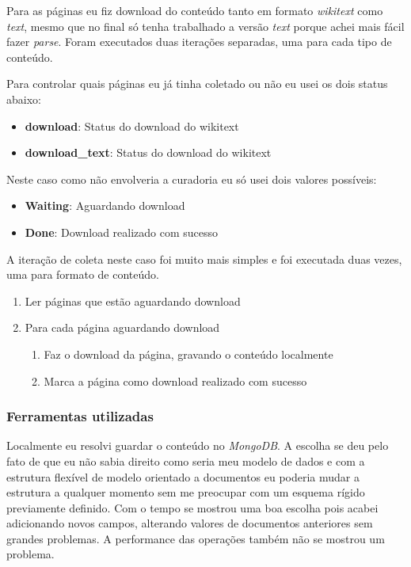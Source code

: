 Para as páginas eu fiz download do conteúdo tanto em formato \textit{wikitext} como \textit{text}, mesmo que no final só tenha trabalhado a 
versão \textit{text} porque achei mais fácil fazer \textit{parse}. Foram executados duas iterações separadas, uma para cada tipo de conteúdo.

Para controlar quais páginas eu já tinha coletado ou não eu usei os dois status abaixo:

\begin{itemize}
    \item \textbf{download}: Status do download do wikitext
    \item \textbf{download\_text}: Status do download do wikitext
\end{itemize}

Neste caso como não envolveria a curadoria eu só usei dois valores possíveis:

\begin{itemize}
    \item \textbf{Waiting}: Aguardando download
    \item \textbf{Done}: Download realizado com sucesso
\end{itemize}

A iteração de coleta neste caso foi muito mais simples e foi executada duas vezes, uma para formato de conteúdo.

\begin{enumerate}
    \item Ler páginas que estão aguardando download
    \item Para cada página aguardando download
    \begin{enumerate}
        \item Faz o download da página, gravando o conteúdo localmente
        \item Marca a página como download realizado com sucesso
    \end{enumerate} 
\end{enumerate}

\subsubsection{Ferramentas utilizadas}

Localmente eu resolvi guardar o conteúdo no \textit{MongoDB}. A escolha se deu pelo fato de que eu não sabia direito como seria meu modelo de dados e 
com a estrutura flexível de modelo orientado a documentos eu poderia mudar a estrutura a qualquer momento sem me preocupar com um esquema rígido
previamente definido. Com o tempo se mostrou uma boa escolha pois acabei adicionando novos campos, alterando valores de documentos anteriores 
sem grandes problemas. A performance das operações também não se mostrou um problema.

